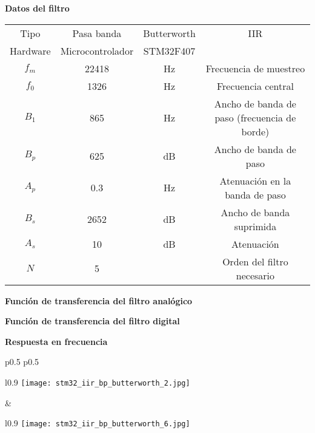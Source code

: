 \documentclass[informe.tex]{subfiles}
\begin{document}
\textbf{Datos del filtro}	\newline	
								
	\begin{tabular}{ |c | c| c| c|}
		\hline
  		    Tipo     & Pasa banda & Butterworth &  IIR \\
 			Hardware & Microcontrolador & STM32F407 & \\
			$ f_m $  & 22418  & Hz & Frecuencia de muestreo \\
			$ f_0 $  & 1326  & Hz & Frecuencia central \\
			$ B_1 $  & 865  & Hz & Ancho de banda de paso (frecuencia de borde)\\
			$ B_p $  & 625  & dB & Ancho de banda de paso \\			
			$ A_p $  & 0.3  & Hz & Atenuación en la banda de paso \\
			$ B_s $  & 2652  & dB & Ancho de banda suprimida \\
			$ A_s $  & 10  & dB & Atenuación \\
			$ N $  & 5  &  & Orden del filtro necesario \\			
		\hline
	\end{tabular}\newline\newline		
	
\textbf{Función de transferencia del filtro analógico}\newline
	\begin{tiny}
		
	\end{tiny}\newline
    	
\textbf{Función de transferencia del filtro digital}\newline
	\begin{tiny}
		
	\end{tiny}\newline
	
\textbf{Respuesta en frecuencia}\newline
	\begin{tabular}{p{0.5\textwidth} p{0.5\textwidth}}		
		\begin{wrapfigure}{l}{0.9\linewidth}
    		\centering
    		\texttt{[image: stm32\_iir\_bp\_butterworth\_2.jpg]}
    		\caption{Filtro analógico}
		\end{wrapfigure}					
		&	
	 	\begin{wrapfigure}{l}{0.9\linewidth}
    		\centering
    		\texttt{[image: stm32\_iir\_bp\_butterworth\_6.jpg]}
    		\caption{Filtro digital}
		\end{wrapfigure}			
	 	\\ 
	\end{tabular}\newpage
	
\end{document}
